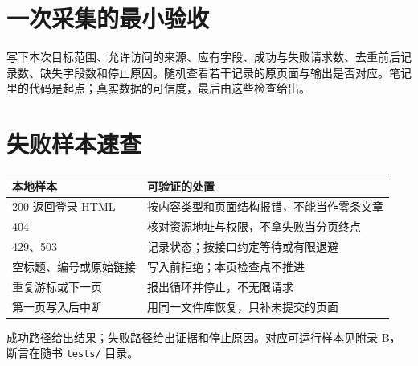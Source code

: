 \section{一次采集的最小验收}
写下本次目标范围、允许访问的来源、应有字段、成功与失败请求数、去重前后记录数、缺失字段数和停止原因。随机查看若干记录的原页面与输出是否对应。笔记里的代码是起点；真实数据的可信度，最后由这些检查给出。

\section{失败样本速查}
\begin{center}\small
\begin{tabularx}{\textwidth}{@{}p{}X@{}}
\toprule
本地样本 & 可验证的处置\\\midrule
200 返回登录 HTML & 按内容类型和页面结构报错，不能当作零条文章\\
404 & 核对资源地址与权限，不拿失败当分页终点\\
429、503 & 记录状态；按接口约定等待或有限退避\\
空标题、编号或原始链接 & 写入前拒绝；本页检查点不推进\\
重复游标或下一页 & 报出循环并停止，不无限请求\\
第一页写入后中断 & 用同一文件库恢复，只补未提交的页面\\
\bottomrule
\end{tabularx}
\end{center}
成功路径给出结果；失败路径给出证据和停止原因。对应可运行样本见附录 B，断言在随书 \texttt{tests/} 目录。
